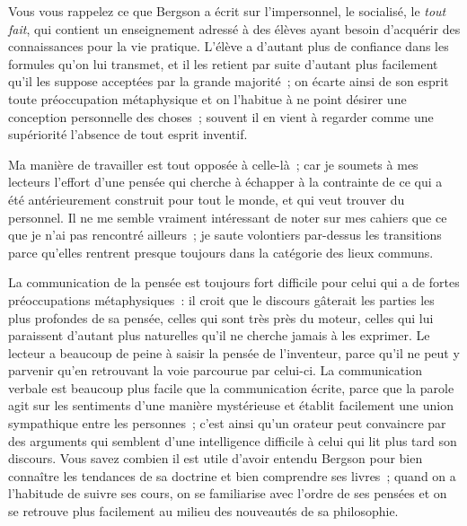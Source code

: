 \documentclass[french,twoside]{book} %
\begin{document}
Vous vous rappelez ce que Bergson a écrit sur l’impersonnel, le socialisé, le \emph{tout fait}, qui contient un enseignement adressé à des élèves ayant besoin d’acquérir des connaissances pour la vie pratique. L’élève a d’autant plus de confiance dans les formules qu’on lui transmet, et il les retient par suite d’autant plus facilement qu’il les suppose acceptées par la grande majorité ; on écarte ainsi de son esprit toute préoccupation métaphysique et on l’habitue à ne point désirer une conception personnelle des choses ; souvent il en vient à regarder comme une supériorité l’absence de tout esprit inventif.\par
Ma manière de travailler est tout opposée à celle-là ; car je soumets à mes lecteurs l’effort d’une pensée qui cherche à échapper à la contrainte de ce qui a été antérieurement construit pour tout le monde, et qui veut trouver du personnel. Il ne me semble vraiment intéressant  de noter sur mes cahiers que ce que je n’ai pas rencontré ailleurs ; je saute volontiers par-dessus les transitions parce qu’elles rentrent presque toujours dans la catégorie des lieux communs.\par
La communication de la pensée est toujours fort difficile pour celui qui a de fortes préoccupations métaphysiques : il croit que le discours gâterait les parties les plus profondes de sa pensée, celles qui sont très près du moteur, celles qui lui paraissent d’autant plus naturelles qu’il ne cherche jamais à les exprimer. Le lecteur a beaucoup de peine à saisir la pensée de l’inventeur, parce qu’il ne peut y parvenir qu’en retrouvant la voie parcourue par celui-ci. La communication verbale est beaucoup plus facile que la communication écrite, parce que la parole agit sur les sentiments d’une manière mystérieuse et établit facilement une union sympathique entre les personnes ; c’est ainsi qu’un orateur peut convaincre par des arguments qui semblent d’une intelligence difficile à celui qui lit plus tard son discours. Vous savez combien il est utile d’avoir entendu Bergson pour bien connaître les tendances de sa doctrine et bien comprendre ses livres ; quand on a l’habitude de suivre ses cours, on se familiarise avec l’ordre de ses pensées et on se retrouve plus facilement au milieu des nouveautés de sa philosophie.\par
\end{document}
